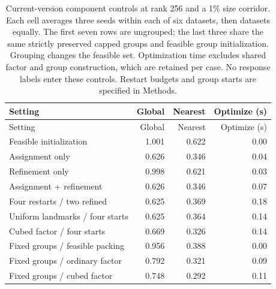 \begin{longtable}{lrrr}
\caption{Current-version component controls at rank 256 and a 1\% size corridor. Each cell averages three seeds within each of six datasets, then datasets equally. The first seven rows are ungrouped; the last three share the same strictly preserved capped groups and feasible group initialization. Grouping changes the feasible set. Optimization time excludes shared factor and group construction, which are retained per case. No response labels enter these controls. Restart budgets and group starts are specified in Methods.}\\
\toprule
Setting & Global & Nearest & Optimize (s)\\\midrule
\endfirsthead
\toprule
Setting & Global & Nearest & Optimize (s)\\\midrule
\endhead
\midrule\endfoot
\bottomrule\endlastfoot
Feasible initialization & 1.001 & 0.622 & 0.00\\
Assignment only & 0.626 & 0.346 & 0.04\\
Refinement only & 0.998 & 0.621 & 0.03\\
Assignment + refinement & 0.626 & 0.346 & 0.07\\
Four restarts / two refined & 0.625 & 0.369 & 0.18\\
Uniform landmarks / four starts & 0.625 & 0.364 & 0.14\\
Cubed factor / four starts & 0.669 & 0.326 & 0.14\\
Fixed groups / feasible packing & 0.956 & 0.388 & 0.00\\
Fixed groups / ordinary factor & 0.792 & 0.321 & 0.09\\
Fixed groups / cubed factor & 0.748 & 0.292 & 0.11\\
\end{longtable}
